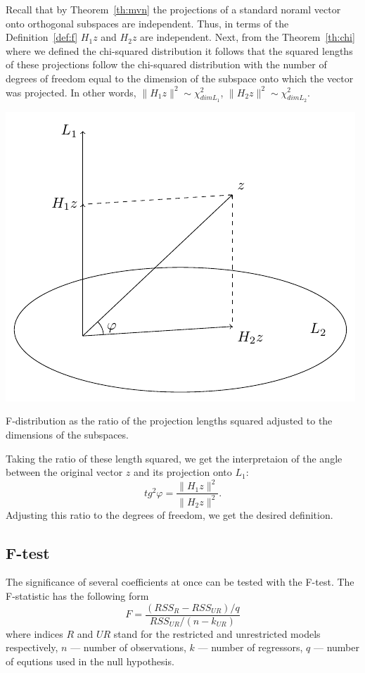 Recall that by Theorem~\ref{th:mvn} the projections of a standard noraml vector
onto orthogonal subspaces are independent.
Thus, in terms of the Definition~\ref{def:f} $H_1 z$ and $H_2 z$ are independent.
Next, from the Theorem~\ref{th:chi} where we defined the chi-squared distribution
it follows that the squared lengths of these projections follow
the chi-squared distribution with the number of degrees of freedom
equal to the dimension of the subspace onto which the vector was projected.
In other words, $\lVert H_1 z \rVert^2 \sim \chi^2_{dim L_1}$,
$\lVert H_2 z \rVert^2 \sim \chi^2_{dim L_2}$.

\begin{marginfigure}
\includegraphics[scale=0.7]{figures/04_f_dist_example.pdf}
\caption{F-distribution as the ratio of the projection lengths squared
adjusted to the dimensions of the subspaces.}
\label{fig:f_dist}
\end{marginfigure}

Taking the ratio of these length squared, we get the interpretaion
of the angle between the original vector $z$ and its projection onto $L_1$:
\[
tg^2 \varphi = \frac{\lVert H_1 z \rVert^2}{\lVert H_2 z \rVert^2}.
\]
Adjusting this ratio to the degrees of freedom, we get the desired definition.


\subsection{F-test}

The significance of several coefficients at once can be tested with the F-test.
The F-statistic has the following form
\[
F = \frac{(RSS_{R} - RSS_{UR})/q}{RSS_{UR}/(n-k_{UR})}
\]
where indices $R$ and $UR$ stand for the restricted and unrestricted models
respectively, $n$ — number of observations, $k$ — number of regressors,
$q$ — number of equtions used in the null hypothesis.

